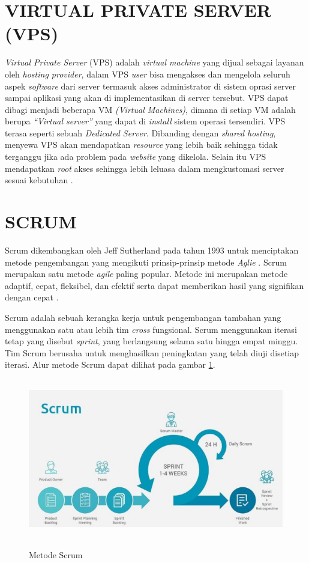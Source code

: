 \section{\uppercase{Virtual Private Server (VPS)}}
\textit{Virtual Private Server} (VPS) adalah \textit{virtual machine} yang dijual sebagai layanan oleh \textit{hosting provider}, dalam VPS \textit{user} bisa mengakses dan mengelola seluruh aspek \textit{software} dari server termasuk akses administrator di sistem oprasi server sampai aplikasi yang akan di implementasikan di server tersebut. VPS dapat dibagi menjadi beberapa VM \textit{(Virtual Machines)}, dimana di setiap VM adalah berupa \textit{“Virtual server”} yang dapat di \textit{install} sistem operasi tersendiri. VPS terasa seperti sebuah \textit{Dedicated Server}. Dibanding dengan \textit{shared hosting}, menyewa VPS akan mendapatkan \textit{resource} yang lebih baik sehingga tidak terganggu jika ada problem pada \textit{website} yang dikelola. Selain itu VPS mendapatkan \textit{root} akses sehingga lebih leluasa dalam mengkustomasi server sesuai kebutuhan \citep{hamida2017analisis}.

\section{\uppercase{Scrum}}
Scrum dikembangkan oleh Jeff Sutherland pada tahun 1993 untuk menciptakan metode pengembangan yang mengikuti prinsip-prinsip metode \textit{Aglie} \citep{fernando2018rancang}. Scrum merupakan satu metode \textit{agile} paling popular. Metode ini merupakan metode adaptif, cepat, fleksibel, dan efektif serta dapat memberikan hasil yang signifikan dengan cepat \citep{hadinata2017implementasi}.

\par Scrum adalah sebuah kerangka kerja untuk pengembangan tambahan yang menggunakan satu atau lebih tim \textit{cross} fungsional. Scrum menggunakan iterasi tetap yang disebut \textit{sprint}, yang berlangsung selama satu hingga empat minggu. Tim Scrum berusaha untuk menghasilkan peningkatan yang telah diuji disetiap iterasi. Alur metode Scrum dapat dilihat pada gambar \ref{scrum}.

\begin{figure}[H]
\centering
{\includegraphics [width = 12.5cm, height= 7cm]{gambar/scrum}}
\caption{Metode Scrum \citep{wahyudi2018analisis}}
\label{scrum}
\end{figure}	

